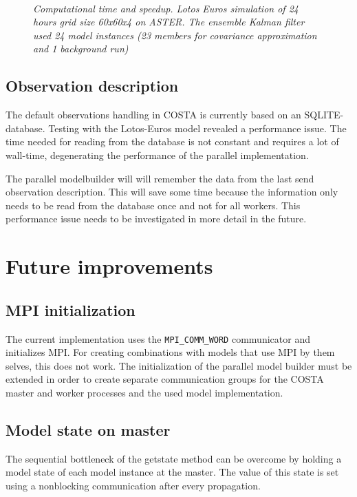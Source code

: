 \begin{figure}
\hbox{
      }

\caption{\em Computational time and speedup. Lotos Euros simulation of 24 
             hours grid size 60x60x4 on ASTER. The ensemble Kalman filter
             used 24 model instances (23 members for covariance approximation
             and 1 background run)}
\label{Fig:vier}
\end{figure}

\subsection{Observation description}
The default observations handling in COSTA is currently based on an
SQLITE-database. Testing with the Lotos-Euros model revealed a performance
issue. The time needed for reading from the database is not constant and
requires a lot of wall-time, degenerating the performance of the parallel
implementation. 

The parallel modelbuilder will will remember the data from the last send
observation description. This will save some time because the information
only needs to be read from the database once and not for all workers.
This performance issue needs to be investigated in more detail in the
future.



\section{Future improvements} \label{Sec:Future improvements}
\subsection{MPI initialization}
The current implementation uses the {\tt MPI\_COMM\_WORD} communicator and
initializes MPI. For creating combinations with models that use MPI by them
selves, this does not work. The initialization of the parallel model
builder must be extended in order to create separate communication groups
for the COSTA master and worker processes and the used model
implementation.

\subsection{Model state on master}
The sequential bottleneck of the getstate method can be overcome by holding
a model state of each model instance at the master. The value of this state
is set using a nonblocking communication after every propagation.

